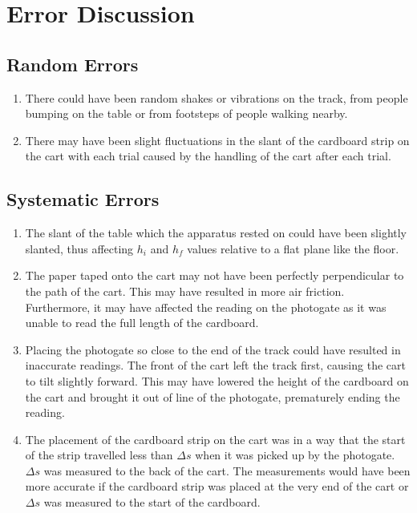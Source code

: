 \documentclass{article}
\begin{document}
\section{Error Discussion}

\subsection{Random Errors}
\begin{enumerate}
    \item There could have been random shakes or vibrations on the track, from people bumping on the table or from footsteps of people walking nearby.
    \item There may have been slight fluctuations in the slant of the cardboard strip on the cart with each trial caused by the handling of the cart after each trial.
\end{enumerate}

\subsection{Systematic Errors}
\begin{enumerate}
    \item The slant of the table which the apparatus rested on could have been slightly slanted, thus affecting $h_i$ and $h_f$ values relative to a flat plane like the floor.
    \item The paper taped onto the cart may not have been perfectly perpendicular to the path of the cart. This may have resulted in more air friction. Furthermore, it may have affected the reading on the photogate as it was unable to read the full length of the cardboard.
    \item Placing the photogate so close to the end of the track could have resulted in inaccurate readings. The front of the cart left the track first, causing the cart to tilt slightly forward. This may have lowered the height of the cardboard on the cart and brought it out of line of the photogate, prematurely ending the reading.
    \item The placement of the cardboard strip on the cart was in a way that the start of the strip travelled less than $\Delta s$ when it was picked up by the photogate. $\Delta s$ was measured to the back of the cart. The measurements would have been more accurate if the cardboard strip was placed at the very end of the cart or $\Delta s$ was measured to the start of the cardboard.
\end{enumerate}
\end{document}
